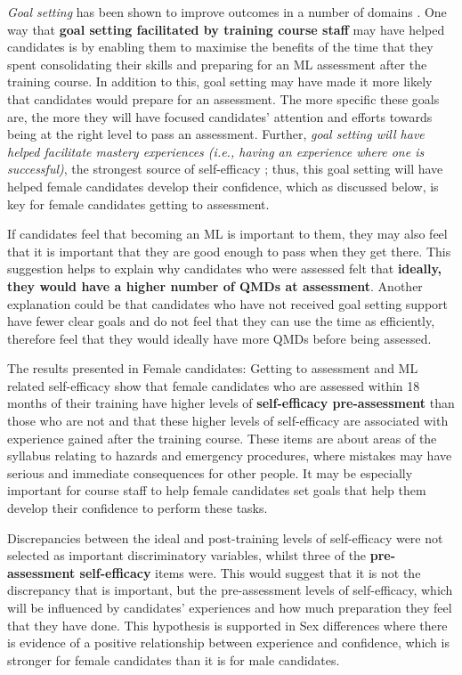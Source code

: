 \documentclass[a4paper,]{book}
\begin{document}
\emph{Goal setting} has been shown to improve outcomes in a number of domains \citep[see][ p 356]{Weinberg2014}. One way that \textbf{goal setting facilitated by training course staff} may have helped candidates is by enabling them to maximise the benefits of the time that they spent consolidating their skills and preparing for an ML assessment after the training course. In addition to this, goal setting may have made it more likely that candidates would prepare for an assessment. The more specific these goals are, the more they will have focused candidates' attention and efforts towards being at the right level to pass an assessment. Further, \emph{goal setting will have helped facilitate mastery experiences (i.e., having an experience where one is successful)}, the strongest source of self-efficacy \citep{Bandura1982}; thus, this goal setting will have helped female candidates develop their confidence, which as discussed below, is key for female candidates getting to assessment.

If candidates feel that becoming an ML is important to them, they may also feel that it is important that they are good enough to pass when they get there. This suggestion helps to explain why candidates who were assessed felt that \textbf{ideally, they would have a higher number of QMDs at assessment}. Another explanation could be that candidates who have not received goal setting support have fewer clear goals and do not feel that they can use the time as efficiently, therefore feel that they would ideally have more QMDs before being assessed.

The results presented in Female candidates: Getting to assessment and ML related self-efficacy show that female candidates who are assessed within 18 months of their training have higher levels of \textbf{self-efficacy pre-assessment} than those who are not and that these higher levels of self-efficacy are associated with experience gained after the training course. These items are about areas of the syllabus relating to hazards and emergency procedures, where mistakes may have serious and immediate consequences for other people. It may be especially important for course staff to help female candidates set goals that help them develop their confidence to perform these tasks.

Discrepancies between the ideal and post-training levels of self-efficacy were not selected as important discriminatory variables, whilst three of the \textbf{pre-assessment self-efficacy} items were. This would suggest that it is not the discrepancy that is important, but the pre-assessment levels of self-efficacy, which will be influenced by candidates' experiences and how much preparation they feel that they have done. This hypothesis is supported in Sex differences where there is evidence of a positive relationship between experience and confidence, which is stronger for female candidates than it is for male candidates.
\end{document}
